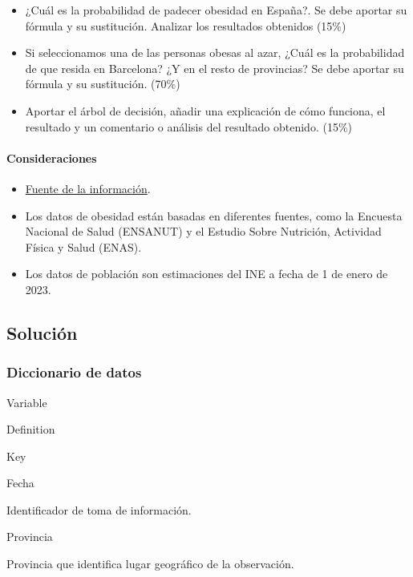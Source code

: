 \documentclass[11pt]{article}
\providecommand{\tightlist}{%
      \setlength{\itemsep}{0pt}\setlength{\parskip}{0pt}}
\begin{document}
\begin{itemize}
\tightlist
\item
  ¿Cuál es la probabilidad de padecer obesidad en España?. Se debe
  aportar su fórmula y su sustitución. Analizar los resultados obtenidos
  (15\%)
\item
  Si seleccionamos una de las personas obesas al azar, ¿Cuál es la
  probabilidad de que resida en Barcelona? ¿Y en el resto de provincias?
  Se debe aportar su fórmula y su sustitución. (70\%)
\item
  Aportar el árbol de decisión, añadir una explicación de cómo funciona,
  el resultado y un comentario o análisis del resultado obtenido. (15\%)
\end{itemize}

\paragraph{Consideraciones}\label{consideraciones}

\begin{itemize}
\tightlist
\item
  \href{https://campus.il3.ub.edu/pluginfile.php/444355/mod_assign/intro/datos_obesidad.xlsx?time=1719295273514}{Fuente
  de la información}.
\item
  Los datos de obesidad están basadas en diferentes fuentes, como la
  Encuesta Nacional de Salud (ENSANUT) y el Estudio Sobre Nutrición,
  Actividad Física y Salud (ENAS).
\item
  Los datos de población son estimaciones del INE a fecha de 1 de enero
  de 2023.
\end{itemize}

    \subsection{Solución}\label{soluciuxf3n}

    \subsubsection{Diccionario de datos}\label{diccionario-de-datos}

    Variable

Definition

Key

Fecha

Identificador de toma de información.

Provincia

Provincia que identifica lugar geográfico de la observación.
\end{document}
